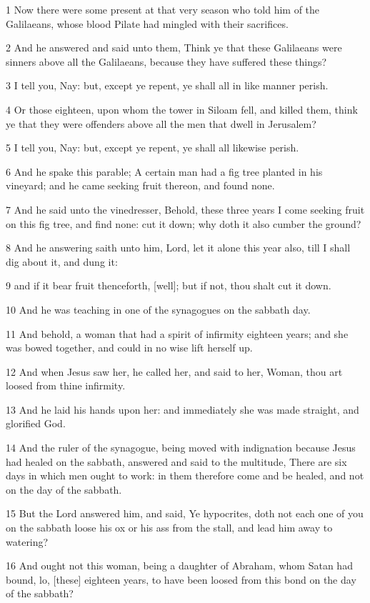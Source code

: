 \par 1 Now there were some present at that very season who told him of the Galilaeans, whose blood Pilate had mingled with their sacrifices.
\par 2 And he answered and said unto them, Think ye that these Galilaeans were sinners above all the Galilaeans, because they have suffered these things?
\par 3 I tell you, Nay: but, except ye repent, ye shall all in like manner perish.
\par 4 Or those eighteen, upon whom the tower in Siloam fell, and killed them, think ye that they were offenders above all the men that dwell in Jerusalem?
\par 5 I tell you, Nay: but, except ye repent, ye shall all likewise perish.
\par 6 And he spake this parable; A certain man had a fig tree planted in his vineyard; and he came seeking fruit thereon, and found none.
\par 7 And he said unto the vinedresser, Behold, these three years I come seeking fruit on this fig tree, and find none: cut it down; why doth it also cumber the ground?
\par 8 And he answering saith unto him, Lord, let it alone this year also, till I shall dig about it, and dung it:
\par 9 and if it bear fruit thenceforth, [well]; but if not, thou shalt cut it down.
\par 10 And he was teaching in one of the synagogues on the sabbath day.
\par 11 And behold, a woman that had a spirit of infirmity eighteen years; and she was bowed together, and could in no wise lift herself up.
\par 12 And when Jesus saw her, he called her, and said to her, Woman, thou art loosed from thine infirmity.
\par 13 And he laid his hands upon her: and immediately she was made straight, and glorified God.
\par 14 And the ruler of the synagogue, being moved with indignation because Jesus had healed on the sabbath, answered and said to the multitude, There are six days in which men ought to work: in them therefore come and be healed, and not on the day of the sabbath.
\par 15 But the Lord answered him, and said, Ye hypocrites, doth not each one of you on the sabbath loose his ox or his ass from the stall, and lead him away to watering?
\par 16 And ought not this woman, being a daughter of Abraham, whom Satan had bound, lo, [these] eighteen years, to have been loosed from this bond on the day of the sabbath?
